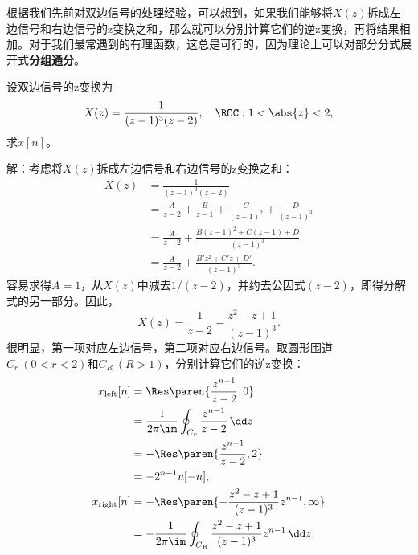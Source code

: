 根据我们先前对双边信号的处理经验，可以想到，如果我们能够将$X(z)$拆成左边信号和右边信号的z变换之和，那么就可以分别计算它们的逆z变换，再将结果相加。对于我们最常遇到的有理函数，这总是可行的，因为理论上可以对部分分式展开式\textbf{分组通分}。
\begin{example}
    设双边信号的z变换为
    \begin{equation}
        X(z)=\frac{1}{(z-1)^3(z-2)},\quad \ROC:1<\abs{z}<2,
    \end{equation}
    求$x[n]$。

    解：考虑将$X(z)$拆成左边信号和右边信号的z变换之和：
    \begin{align}
        X(z) & =\frac{1}{(z-1)^3(z-2)}\nonumber                                          \\
             & =\frac{A}{z-2}+\frac{B}{z-1}+\frac{C}{(z-1)^2}+\frac{D}{(z-1)^3}\nonumber \\
             & =\frac{A}{z-2}+\frac{B(z-1)^2+C(z-1)+D}{(z-1)^3}\nonumber                 \\
             & =\frac{A}{z-2}+\frac{B'z^2+C'z+D'}{(z-1)^3}.
    \end{align}
    容易求得$A=1$，从$X(z)$中减去$1/(z-2)$，并约去公因式$(z-2)$，即得分解式的另一部分。因此，
    \begin{equation}
        X(z)=\frac{1}{z-2}-\frac{z^2-z+1}{(z-1)^3}.
    \end{equation}
    很明显，第一项对应左边信号，第二项对应右边信号。取圆形围道$C_r\ (0<r<2)$和$C_R\ (R>1)$，分别计算它们的逆z变换：
    \begin{align}
        x_{\text{left}}[n]  & =\Res\paren{\frac{z^{n-1}}{z-2},0}\nonumber                                                                \\
                            & =\frac{1}{2\pi\im}\oint_{C_r}\frac{z^{n-1}}{z-2}\,\dd z\nonumber                                           \\
                            & =-\Res\paren{\frac{z^{n-1}}{z-2},2}\nonumber                                                               \\
                            & =-2^{n-1}u[-n],                                                                                            \\
        x_{\text{right}}[n] & =-\Res\paren{-\frac{z^2-z+1}{(z-1)^3}z^{n-1},\infty}\nonumber                                              \\
                            & =-\frac{1}{2\pi\im}\oint_{C_R}\frac{z^2-z+1}{(z-1)^3}z^{n-1}\,\dd z\nonumber                               \\

\end{align}
\end{example}
